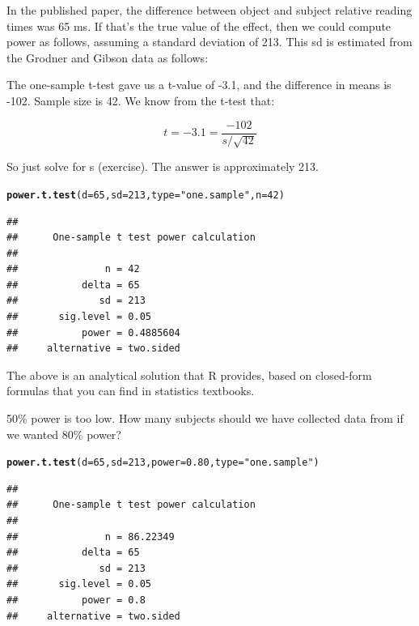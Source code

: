 \documentclass[12pt]{book}\usepackage[]{graphicx}\usepackage[]{color}
\makeatletter
\newcommand{\hlnum}[1]{\textcolor[rgb]{0.686,0.059,0.569}{#1}}%
\newcommand{\hlstr}[1]{\textcolor[rgb]{0.192,0.494,0.8}{#1}}%
\newcommand{\hlstd}[1]{\textcolor[rgb]{0.345,0.345,0.345}{#1}}%
\newcommand{\hlkwc}[1]{\textcolor[rgb]{0.333,0.667,0.333}{#1}}%
\newcommand{\hlkwd}[1]{\textcolor[rgb]{0.737,0.353,0.396}{\textbf{#1}}}%
\newenvironment{kframe}{%
 \def\at@end@of@kframe{}%
 \ifinner\ifhmode%
  \def\at@end@of@kframe{\end{minipage}}%
  \begin{minipage}{\columnwidth}%
 \fi\fi%
 \def\FrameCommand##1{\hskip\@totalleftmargin \hskip-\fboxsep
 \colorbox{shadecolor}{##1}\hskip-\fboxsep
     \hskip-\linewidth \hskip-\@totalleftmargin \hskip\columnwidth}%
 \MakeFramed {\advance\hsize-\width
   \@totalleftmargin\z@ \linewidth\hsize
   \@setminipage}}%
 {\par\unskip\endMakeFramed%
 \at@end@of@kframe}
\newenvironment{knitrout}{}{} %
\makeatother
\begin{document}
In the published paper, the difference between object and subject relative reading times was 65 ms. If that's the true value of the effect, then we could compute power as follows, assuming a standard deviation of 213. This sd is estimated from the Grodner and Gibson data as follows:

The one-sample t-test gave us a t-value of -3.1, and the difference in means is -102. Sample size is 42. We know from the t-test that:

\begin{equation}
t= -3.1=\frac{-102}{s/\sqrt{42}}
\end{equation}

So just solve for s (exercise). The answer is approximately 213. 

\begin{knitrout}
\color{fgcolor}\begin{kframe}
\begin{alltt}
\hlkwd{power.t.test}\hlstd{(}\hlkwc{d}\hlstd{=}\hlnum{65}\hlstd{,}\hlkwc{sd}\hlstd{=}\hlnum{213}\hlstd{,}\hlkwc{type}\hlstd{=}\hlstr{"one.sample"}\hlstd{,}\hlkwc{n}\hlstd{=}\hlnum{42}\hlstd{)}
\end{alltt}
\begin{verbatim}
## 
##      One-sample t test power calculation 
## 
##               n = 42
##           delta = 65
##              sd = 213
##       sig.level = 0.05
##           power = 0.4885604
##     alternative = two.sided
\end{verbatim}
\end{kframe}
\end{knitrout}

The above is an analytical solution that R provides, based on closed-form formulas that you can find in statistics textbooks.

50\% power is too low. How many subjects should we have collected data from if we wanted 80\% power?

\begin{knitrout}
\color{fgcolor}\begin{kframe}
\begin{alltt}
\hlkwd{power.t.test}\hlstd{(}\hlkwc{d}\hlstd{=}\hlnum{65}\hlstd{,}\hlkwc{sd}\hlstd{=}\hlnum{213}\hlstd{,}\hlkwc{power}\hlstd{=}\hlnum{0.80}\hlstd{,}\hlkwc{type}\hlstd{=}\hlstr{"one.sample"}\hlstd{)}
\end{alltt}
\begin{verbatim}
## 
##      One-sample t test power calculation 
## 
##               n = 86.22349
##           delta = 65
##              sd = 213
##       sig.level = 0.05
##           power = 0.8
##     alternative = two.sided
\end{verbatim}
\end{kframe}
\end{knitrout}
\end{document}
